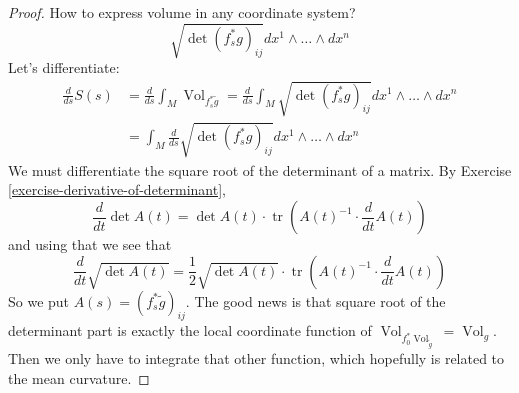 \documentclass{book}
\begin{document}
\begin{proof}
How to express volume in any coordinate
system?
\[\sqrt{\det (f^*
_sg)_{ij}}dx^1\wedge\ldots\wedge dx^n\]
Let's differentiate:
$$
\begin{aligned}
\frac{d}{ds}S(s)&=\frac{d}{ds}
\int_M\operatorname{Vol}_{f^*_s\tilde{g}}
=\frac{d}{ds}\int_M \sqrt{\det (f^*
_sg)_{ij}}dx^1\wedge\ldots\wedge dx^n\\
&=\int_M \frac{d}{ds}\sqrt{\det (f^*
_sg)_{ij}}dx^1\wedge\ldots\wedge dx^n
\end{aligned}
$$
We must differentiate the square root of the
determinant of a matrix. By
Exercise
\ref{exercise-derivative-of-determinant},
$$
\frac{d}{dt}\det A(t)=
\det A(t) \cdot
\operatorname{tr}\left(A(t)^{-1}\cdot
\frac{d}{dt}A(t)\right)
$$
and using that we see that
$$
\frac{d}{dt}\sqrt{\det A(t)}
=\frac{1}{2}\sqrt{\det A(t)}
\cdot\operatorname{tr}\left(A(t)^{-1}\cdot
\frac{d}{dt}A(t)\right)
$$
So we put $A(s)=(f^*_s\tilde{g})_{ij}$. The
good news is that square root of the
determinant part is exactly the local
coordinate function of
$\operatorname{Vol}_{f_0^*\operatorname{Vol}
_{\tilde{g}}}=\operatorname{Vol}_g$.
Then we only have to integrate that other
function, which hopefully is related
to the mean curvature.


\end{proof}
\end{document}
